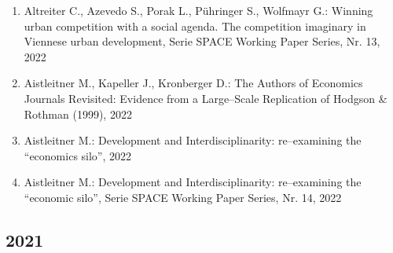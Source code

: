 \begin{enumerate}
	 \item Altreiter C., Azevedo S., Porak L., Pühringer S., Wolfmayr G.: Winning urban competition with a social agenda. The competition imaginary in Viennese urban development, Serie SPACE Working Paper Series, Nr. 13, 2022
	 \item Aistleitner M., Kapeller J., Kronberger D.: The Authors of Economics Journals Revisited: Evidence from a Large--Scale Replication of Hodgson \& Rothman (1999), 2022
	 \item Aistleitner M.: Development and Interdisciplinarity: re--examining the “economics silo”, 2022
	 \item Aistleitner M.: Development and Interdisciplinarity: re--examining the “economic silo”, Serie SPACE Working Paper Series, Nr. 14, 2022
\end{enumerate}
\subsection*{2021}
